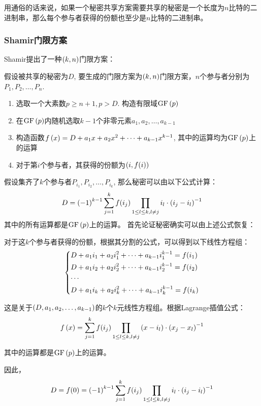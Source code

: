 用通俗的话来说，如果一个秘密共享方案需要共享的秘密是一个长度为$n$比特的二进制串，那么每个参与者获得的份额也至少是$n$比特的二进制串。
\subsubsection{Shamir门限方案}
Shamir提出了一种$\left( {k, n}\right)$门限方案：\par
假设被共享的秘密为$D$, 要生成的门限方案为$\left( {k, n}\right)$门限方案，$n$个参与者分别为$P_1, P_2,\ldots, P_n$.
\begin{enumerate}
	\item 选取一个大素数$p\geq n+1, p>D$. 构造有限域$\mathrm{GF}\left( {p}\right)$
	\item 在$\mathrm{GF}\left( {p}\right)$内随机选取$k-1$个非零元素$a_1, a_2,\ldots, a_{k-1}$
	\item 构造函数$f\left( {x}\right)=D+a_1x+a_2x^2+\cdots +a_{k-1}x^{k-1}$, 其中的运算均为$\mathrm{GF}\left( {p}\right)$上的运算
	\item 对于第$i$个参与者，其获得的份额为$\left( {i, f(i)}\right)$
\end{enumerate}
假设集齐了$k$个参与者$P_{i_1}, P_{i_2}, \ldots, P_{i_k}$, 那么秘密可以由以下公式计算：
\begin{equation}
D=\left( {-1}\right)^{k-1}\sum_{j=1}^kf(i_j)\prod_{1\leq l\leq k, l\neq j}i_l\cdot\left( {i_j-i_l}\right)^{-1}
\end{equation}
其中的所有运算都是$\mathrm{GF}\left( {p}\right)$上的运算。
首先论证秘密确实可以由上述公式恢复：\par
对于这$k$个参与者获得的份额，根据其分割的公式，可以得到以下线性方程组：
\begin{equation}
\begin{dcases}
D+a_1i_1+a_2i_1^2+\cdots +a_{k-1}i_1^{k-1}=f(i_1)\\
D+a_1i_2+a_2i_2^2+\cdots +a_{k-1}i_2^{k-1}=f(i_2)\\
\cdots\\
D+a_1i_k+a_2i_k^2+\cdots +a_{k-1}i_k^{k-1}=f(i_k)
\end{dcases}
\end{equation}

这是关于$\left( {D, a_1, a_2,\ldots, a_{k-1}}\right)$的$k$个$k$元线性方程组。根据Lagrange插值公式：
\begin{equation}
f\left( {x}\right)=\sum_{j=1}^kf(i_j)\prod_{1\leq l\leq k, l\neq j}\left( {x-i_l}\right)\cdot\left( {x_j-x_l}\right)^{-1}
\end{equation}

其中的运算都是$\mathrm{GF}\left( {p}\right)$上的运算。\par
因此，
\begin{equation}
D=f(0)=\left( {-1}\right)^{k-1}\sum_{j=1}^kf(i_j)\prod_{1\leq l\leq k, l\neq j}i_l\cdot\left( {i_j-i_l}\right)^{-1}
\end{equation}

